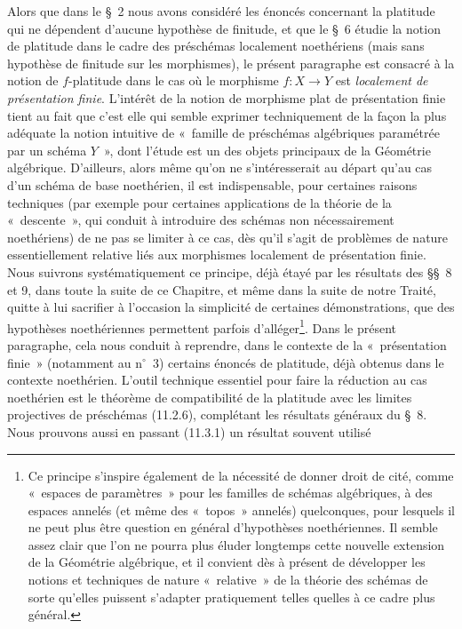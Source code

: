 Alors que dans le \S~2 nous avons considéré les énoncés concernant la platitude
qui ne dépendent d'aucune hypothèse de finitude, et que le \S~6 étudie la notion
de platitude dans le cadre des préschémas localement noethériens (mais sans
hypothèse de finitude sur les morphismes), le présent paragraphe est consacré à
la notion de $f$-platitude dans le cas où le morphisme $f:X\to Y$ est
\emph{localement de présentation finie}. L'intérêt de la notion de morphisme
plat de présentation finie tient au fait que c'est elle qui semble exprimer
techniquement de la façon la plus adéquate la notion intuitive de «~famille de
préschémas algébriques paramétrée par un schéma $Y$~», dont l'étude est un des
objets principaux de la Géométrie algébrique. D'ailleurs, alors même qu'on ne
s'intéresserait au départ qu'au cas d'un schéma de base noethérien, il est
indispensable, pour certaines raisons techniques (par exemple pour certaines
applications de la théorie de la «~descente~», qui conduit à introduire des
schémas non nécessairement noethériens) de ne pas se limiter à ce cas, dès
qu'il s'agit de problèmes de nature essentiellement relative liés aux
morphismes localement de présentation finie. Nous suivrons systématiquement ce
principe, déjà étayé par les résultats des \S\S~8 et 9, dans toute la suite de ce
Chapitre, et même dans la suite de notre Traité, quitte à lui sacrifier à
l'occasion la simplicité de certaines démonstrations, que des hypothèses
noethériennes permettent parfois d'alléger\footnote{Ce principe s'inspire
également de la nécessité de donner droit de cité, comme «~espaces de
paramètres~» pour les familles de schémas algébriques, à des espaces annelés
(et même des «~topos~» annelés) quelconques, pour lesquels il ne peut plus être
question en général d'hypothèses noethériennes. Il semble assez clair que l'on
ne pourra plus éluder longtemps cette nouvelle extension de la Géométrie
algébrique, et il convient dès à présent de développer les notions et
techniques de nature «~relative~» de la théorie des schémas de sorte qu'elles
puissent s'adapter pratiquement telles quelles à ce cadre plus général.}. Dans
le présent paragraphe, cela nous conduit à reprendre, dans le contexte de la
«~présentation finie~» (notamment au n$^\circ$~3) certains énoncés de platitude,
déjà obtenus dans le contexte noethérien. L'outil technique essentiel pour
faire la réduction au cas noethérien est le théorème de compatibilité de la
platitude avec les limites projectives de préschémas (11.2.6), complétant les
résultats généraux du \S~8. Nous prouvons aussi en passant (11.3.1) un résultat
souvent utilisé


